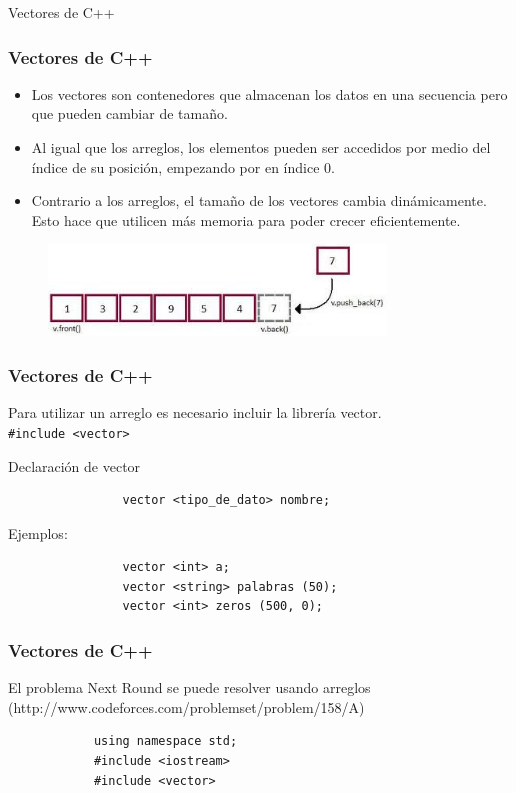 \documentclass{beamer}
\begin{document}
\begin{section}{Vectores de C++}
	\begin{frame}[fragile]
		\frametitle{Vectores de C++}
		\begin{itemize}
			\item {Los vectores son contenedores que almacenan los datos en una secuencia pero que pueden cambiar de tamaño.}
			\item {Al igual que los arreglos, los elementos pueden ser accedidos por medio del índice de su posición, empezando por en índice 0.}
			\item {Contrario a los arreglos, el tamaño de los vectores cambia dinámicamente. Esto hace que utilicen más memoria para poder crecer eficientemente.}
		\end{itemize}
		\begin{figure}
			\includegraphics[width = 0.8\textwidth]{vector.jpg}
		\end{figure}
	\end{frame}
	
	\begin{frame}[fragile]
		\frametitle{Vectores de C++}
		Para utilizar un arreglo es necesario incluir la librería vector.\\
		\verb|#include <vector> |
		\begin{block}{Declaración de vector}
			\begin{verbatim}
				vector <tipo_de_dato> nombre;
			\end{verbatim}
			Ejemplos:\\
			\begin{verbatim}
				vector <int> a;
				vector <string> palabras (50);
				vector <int> zeros (500, 0);
			\end{verbatim}			
		\end{block}		
	\end{frame}
	
	\begin{frame}[fragile]
		\frametitle{Vectores de C++}
		\small{El problema Next Round se puede resolver usando arreglos (http://www.codeforces.com/problemset/problem/158/A)}
		\begin{lstlisting}
			using namespace std;
			#include <iostream>
			#include <vector>


\end{lstlisting}
\end{frame}
\end{section}
\end{document}
